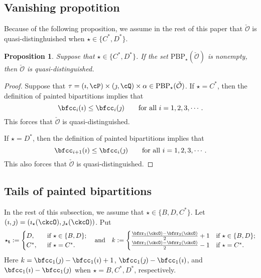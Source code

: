 \documentclass[12pt,a4paper]{amsart}
\newcommand{\CO}{{\mathcal {O}}}
\numberwithin{equation}{section}
\newtheorem{prop}[thm]{Proposition}
\theoremstyle{remark}
\begin{document}
\subsection{Vanishing propotition}
Because of the following proposition, we assume in the rest of this paper that $\check \CO$ is quasi-distinghuished  when $\star\in \{C^*, D^*\}$.


\begin{prop}
  Suppose that $\star\in \{C^*, D^*\}$. If the set $\mathrm{PBP}_\star(\check \CO)$ is nonempty, then $\check \CO$ is quasi-distinguished.
\end{prop}
\begin{proof}
  Suppose that $\tau=(\imath,\cP)\times(\jmath,\cQ)\times \alpha \in  \mathrm{PBP}_\star(\check \CO)$. If  $\star=C^*$, then  the definition of painted bipartitions implies that
 \[
 \bfcc_i(\imath)\leq \bfcc_i(\jmath) \qquad \textrm{for all } i=1,2,3, \cdots.
 \]
This forces that $\check \CO$ is quasi-distinguished.

 If  $\star=D^*$, then  the definition of painted bipartitions implies that
 \[
 \bfcc_{i+1}(\imath)\leq \bfcc_i(\jmath) \qquad \textrm{for all } i=1,2,3, \cdots.
 \]
This  also forces that   $\check \CO$ is quasi-distinguished.
 \end{proof}


\subsection{Tails of painted bipartitions}
\label{sec:tail}
In the rest of this subsection, we assume that $\star\in\{B, D, C^*\}$.
Let $(\imath,\jmath) = (\imath_{\star}(\ckcO),\jmath_{\star}(\ckcO))$.
Put
\[
  \star_{\mathbf t}:= \begin{cases}
  D, & \ \text{ if $\star\in \{B,D\}$}; \\
  C^*, &\  \text{ if $\star=C^*$}.
\end{cases}
\quad
\text{and}
\quad
k := \begin{cases}
  \frac{\bfrr_{1}(\ckcO)-\bfrr_{2}(\ckcO)}{2} + 1 &
    \text{if $\star\in \{B,D\}$}; \\
\frac{\bfrr_{1}(\ckcO)-\bfrr_{2}(\ckcO)}{2} -1 &  \text{if $\star=C^*$}.
  \end{cases}
\]
Here $k = \bfcc_{1}(\jmath)-\bfcc_{1}(\imath)+1$,
$\bfcc_{1}(\jmath)-\bfcc_{1}(\imath)$,
and $\bfcc_{1}(\imath)-\bfcc_{1}(\jmath)$
when $\star = B,C^{*},D^{*}$, respectively.
\end{document}

